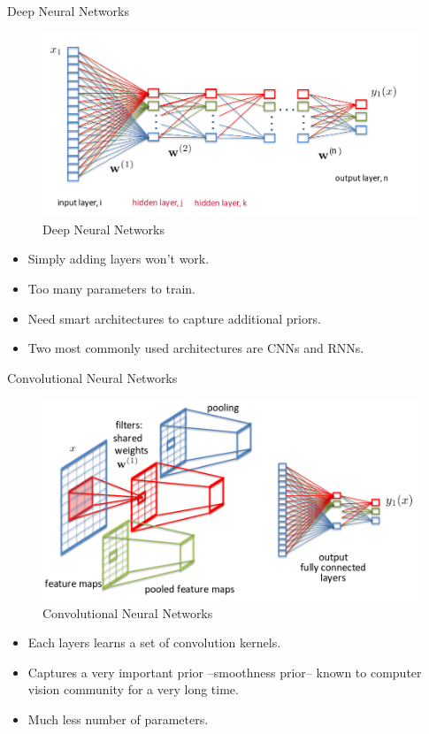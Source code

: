 ﻿\documentclass[table,aspectratio=43,mathserif,xcolor={usenames,dvipsnames,svgnames,table},10pt]{beamer}
\begin{document}
\begin{frame}{Deep Neural Networks}
 \begin{figure}[h]
    \includegraphics[width=0.7\linewidth]{images/dnn.png}  
    \caption{Deep Neural Networks}
  \end{figure}
  \begin{itemize}
   \item<+-> Simply adding layers won't work.
   \item<+-> Too many parameters to train.
   \item<+-> Need smart architectures to capture additional priors.
   \item<+-> Two most commonly used architectures are CNNs and RNNs.
  \end{itemize}
\end{frame}

\begin{frame}{Convolutional Neural Networks}
\begin{figure}[h]
    \includegraphics[width=0.7\linewidth]{images/cnn.png}  
    \caption{Convolutional Neural Networks}
  \end{figure}
\begin{itemize}
\item<+-> Each layers learns a set of convolution kernels.
\item<+-> Captures a very important prior --smoothness prior-- known to computer vision community for a very long time.
\item<+-> Much less number of parameters.
\end{itemize}
\end{frame}
\end{document}
